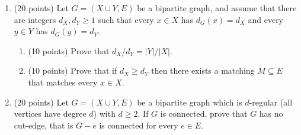 \documentclass[11pt]{article}
\begin{document}
\begin{enumerate}
\begin{enumerate}[label=(\alph*)]
\begin{proof}
            Let \(G'\) be a subgraph of \(\bar G\) with vertex set \(V'\).  Since \(xy \in E(G')\) for all \(x,y \in V(G')\), we have that \(G' = K_{|V'|}\), so \(\chi(G') = |V'| = \alpha(G)\).  Finally, since \(G' \subseteq \bar G\), we can conclude that 
            \[\chi(\bar G) \geq \chi(G') = \alpha(G).\]
          \end{proof}
          

        \item (5 points) Show that \(\chi(G) \cdot \alpha(G) \geq |V|\). \\
          (Hint: Use a proper vertex-coloring of \(G\) to decompose its vertex set \(V = V_1 \cup V_2 \cup \hdots \cup V_{\chi(G)}\) into its color-classes. How does this help?)

        \item (5 points) Show that \(\chi(G) \cdot \chi(\bar G) \geq |V|\).
          \begin{proof}
            This follows directly from (a) and (b): \(\chi(G) \cdot \chi(\bar G) \geq \chi(G) \cdot \alpha(G) \geq |V|\).
          \end{proof}
          

        \item (5 points) Show that \(\chi(G) + \chi(\bar G) \geq 2 \sqrt{|V|}\).
          \begin{proof}
            The arithmetic-geometric mean inequality states that for any two nonnegative integers \(x,y\):
            \[x + y \;\geq\; 2 \sqrt{xy}.\]
            Using this in conjunction with our result from (c) yields the desired inequality:
            \[\chi(G) + \chi(\bar G) \;\geq\; 2 \sqrt{\chi(G) \cdot \chi(\bar G)} \;\geq\; 2 \sqrt{|V|}.\]
          \end{proof}
          
      \end{enumerate}

    \item (20 points) Let \(G = (X \cup Y, E)\) be a bipartite graph, and assume that there are integers \(d_X, d_Y \geq 1\) such that every \(x \in X\) has \(d_G(x) = d_X\) and every \(y \in Y\) has \(d_G(y) = d_Y\).
      \begin{enumerate}
        \item (10 points) Prove that \(d_X / d_Y = |Y|/|X|\).

        \item (10 points) Prove that if \(d_X \geq d_Y\) then there exists a matching \(M \subseteq E\) that matches every \(x \in X\).
      \end{enumerate}

    \item (20 points) Let \(G = (X \cup Y, E)\) be a bipartite graph which is \(d\)-regular (all vertices have degree \(d\)) with \(d \geq 2\).  If \(G\) is connected, prove that \(G\) has no cut-edge, that is \(G - e\) is connected for every \(e \in E\).
  \end{enumerate}
\end{document}
